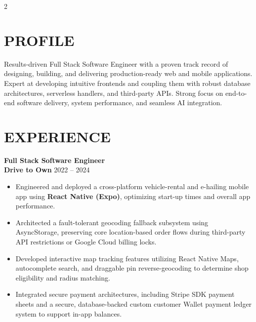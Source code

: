 \documentclass[10pt]{article}
\begin{document}
\begin{multicols}{2}

\section*{\color{primary}\normalsize PROFILE}
\vspace{-0.8em}
{\small Results-driven Full Stack Software Engineer with a proven track record of designing, building, and delivering production-ready web and mobile applications. Expert at developing intuitive frontends and coupling them with robust database architectures, serverless handlers, and third-party APIs. Strong focus on end-to-end software delivery, system performance, and seamless AI integration.}

\section*{\color{primary}\normalsize EXPERIENCE}
\vspace{-0.8em}

{\small\textbf{Full Stack Software Engineer}}\\[2pt]
{\small\textbf{\color{primary}Drive to Own} \hfill 2022 -- 2024}
\begin{itemize}
    \setlength{\itemsep}{2pt}\setlength{\parsep}{0pt}\small
    \item Engineered and deployed a cross-platform vehicle-rental and e-hailing mobile app using \textbf{React Native (Expo)}, optimizing start-up times and overall app performance.
    \item Architected a fault-tolerant geocoding fallback subsystem using AsyncStorage, preserving core location-based order flows during third-party API restrictions or Google Cloud billing locks.
    \item Developed interactive map tracking features utilizing React Native Maps, autocomplete search, and draggable pin reverse-geocoding to determine shop eligibility and radius matching.
    \item Integrated secure payment architectures, including Stripe SDK payment sheets and a secure, database-backed custom customer Wallet payment ledger system to support in-app balances.
\end{itemize}


\end{multicols}
\end{document}

